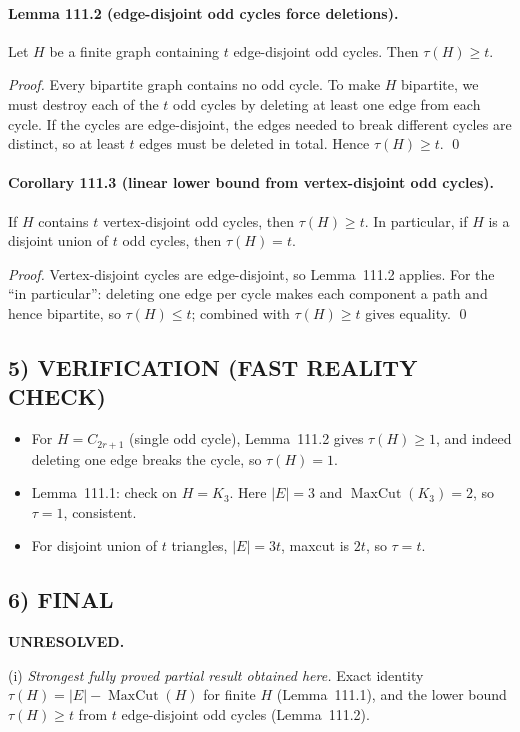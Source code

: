 \paragraph{Lemma 111.2 (edge-disjoint odd cycles force deletions).}
Let $H$ be a finite graph containing $t$ edge-disjoint odd cycles.  Then $\tau(H)\ge t$.

\emph{Proof.}
Every bipartite graph contains no odd cycle.  To make $H$ bipartite, we must destroy each of the $t$ odd cycles by deleting at least one edge from each cycle.  If the cycles are edge-disjoint, the edges needed to break different cycles are distinct, so at least $t$ edges must be deleted in total. Hence $\tau(H)\ge t$. \qed

\paragraph{Corollary 111.3 (linear lower bound from vertex-disjoint odd cycles).}
If $H$ contains $t$ vertex-disjoint odd cycles, then $\tau(H)\ge t$.  In particular, if $H$ is a disjoint union of $t$ odd cycles, then $\tau(H)=t$.

\emph{Proof.}
Vertex-disjoint cycles are edge-disjoint, so Lemma~111.2 applies.  For the ``in particular'': deleting one edge per cycle makes each component a path and hence bipartite, so $\tau(H)\le t$; combined with $\tau(H)\ge t$ gives equality. \qed

\subsection*{5) VERIFICATION (FAST REALITY CHECK)}
\begin{itemize}
\item For $H=C_{2r+1}$ (single odd cycle), Lemma~111.2 gives $\tau(H)\ge1$, and indeed deleting one edge breaks the cycle, so $\tau(H)=1$.
\item Lemma~111.1: check on $H=K_3$. Here $|E|=3$ and $\operatorname{MaxCut}(K_3)=2$, so $\tau=1$, consistent.
\item For disjoint union of $t$ triangles, $|E|=3t$, maxcut is $2t$, so $\tau=t$.
\end{itemize}

\subsection*{6) FINAL}
\textbf{UNRESOLVED.}

(i) \emph{Strongest fully proved partial result obtained here.}
Exact identity $\tau(H)=|E|-\operatorname{MaxCut}(H)$ for finite $H$ (Lemma~111.1), and the lower bound $\tau(H)\ge t$ from $t$ edge-disjoint odd cycles (Lemma~111.2).

